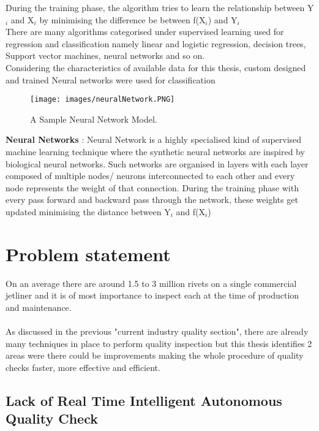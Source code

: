 \documentclass{article}
\begin{document}
During the training phase, the algorithm tries to learn the relationship between Y$_{i}$ and X$_{i}$ by minimising the difference be between f(X$_{i}$) and Y$_{i}$
\\

There are many algorithms categorised under supervised learning used for regression and classification namely linear and logistic regression, decision trees, Support vector machines, neural networks and so on.\\

Considering the characteristics of available data for this thesis, custom designed and trained Neural networks were used for classification \\

\begin{figure}[H]
    \centering
    \texttt{[image: images/neuralNetwork.PNG]}
    \caption{A Sample Neural Network Model.}
    \label{fig: Neural Network}
\end{figure}

\textbf{Neural Networks} : Neural Network is a highly specialised kind of supervised machine learning technique where the synthetic neural networks are inspired by biological neural networks. Such networks are organised in layers with each layer composed of multiple nodes/ neurons interconnected to each other and every node represents the weight of that connection. During the training phase with every pass forward and backward pass through the network, these weights get updated minimising the distance between Y$_{i}$ and f(X$_{i}$)

\section{Problem statement}

On an average there are around 1.5 to 3 million rivets on a single commercial jetliner and it is of most importance to inspect each at the time of production and maintenance.\\\\
As discussed in the previous "current industry quality section", there are already many techniques in place to perform quality inspection but this thesis identifies 2 areas were there could be improvements making the whole procedure of quality checks faster, more effective and efficient.

\subsection{Lack of Real Time Intelligent Autonomous Quality Check }
\end{document}
